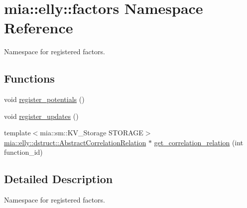 \hypertarget{namespacemia_1_1elly_1_1factors}{\section{mia\-:\-:elly\-:\-:factors Namespace Reference}
\label{namespacemia_1_1elly_1_1factors}
}


Namespace for registered factors.  


\subsection*{Functions}
\begin{DoxyCompactItemize}
\item 
void \hyperlink{namespacemia_1_1elly_1_1factors_a1e408cecf7e7bdba69d9ce1bb78b5ec0}{register\-\_\-potentials} ()
\item 
void \hyperlink{namespacemia_1_1elly_1_1factors_a3b2e7562146e4d807ec2855fccbc8282}{register\-\_\-updates} ()
\item 
{\footnotesize template$<$mia\-::sm\-::\-K\-V\-\_\-\-Storage S\-T\-O\-R\-A\-G\-E$>$ }\\\hyperlink{classmia_1_1elly_1_1dstruct_1_1_abstract_correlation_relation}{mia\-::elly\-::dstruct\-::\-Abstract\-Correlation\-Relation} $\ast$ \hyperlink{namespacemia_1_1elly_1_1factors_a52975b837a6ff295ebe531bca52168f1}{get\-\_\-correlation\-\_\-relation} (int function\-\_\-id)
\end{DoxyCompactItemize}


\subsection{Detailed Description}
Namespace for registered factors. 

